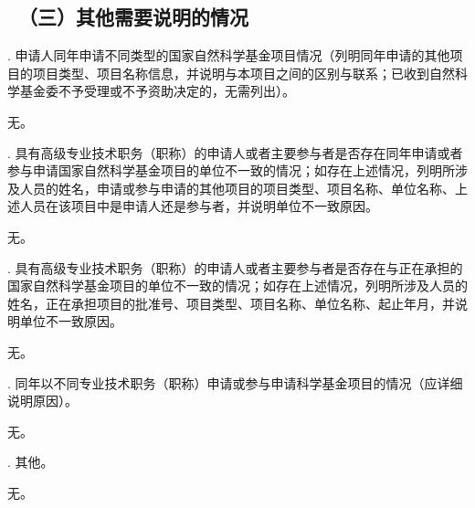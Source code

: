 {\color{MsBlue} \subsection{\texorpdfstring{\sihao \kaishu \quad \ （三）其他需要说明的情况 }{（三）其他需要说明的情况 }}}

{\sihao \color{MsBlue} . 申请人同年申请不同类型的国家自然科学基金项目情况（列明同年申请的其他项目的项目类型、项目名称信息，并说明与本项目之间的区别与联系；已收到自然科学基金委不予受理或不予资助决定的，无需列出）。}

无。

\vskip 5mm


{\sihao \color{MsBlue} . 具有高级专业技术职务（职称）的申请人或者主要参与者是否存在同年申请或者参与申请国家自然科学基金项目的单位不一致的情况；\hspace{0.1em}如存在上述情况，列明所涉及人员的姓名，申请或参与申请的其他项目的项目类型、\hspace{0.1em}项目名称、\hspace{0.1em}单位名称、\hspace{0.1em}上述人员在该项目中是申请人还是参与者，并说明单位不一致原因。}

无。

\vskip 5mm


{\sihao \color{MsBlue} . 具有高级专业技术职务（职称）的申请人或者主要参与者是否存在与正在承担的国家自然科学基金项目的单位不一致的情况；如存在上述情况，\hspace{0.1em}列明所涉及人员的姓名，\hspace{0.1em}正在承担项目的批准号、\hspace{0.1em}项目类型、项目名称、单位名称、起止年月，并说明单位不一致原因。}

无。

\vskip 5mm


{\sihao \color{MsBlue} . 同年以不同专业技术职务（职称）申请或参与申请科学基金项目的情况（应详细说明原因）。}

无。

\vskip 5mm


{\sihao \color{MsBlue} . 其他。}

无。
